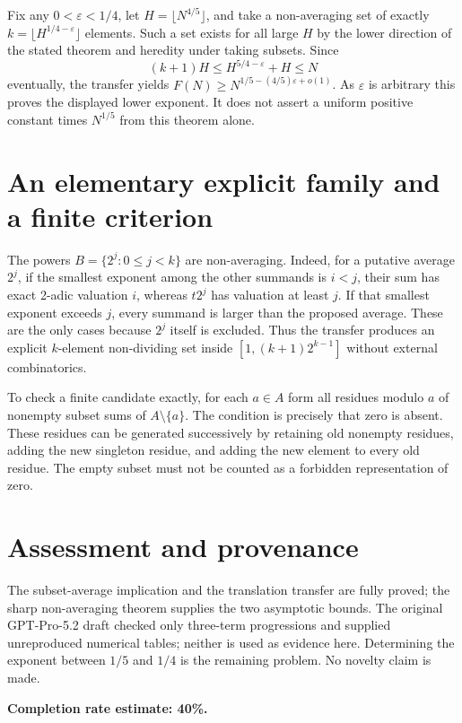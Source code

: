 \documentclass[11pt]{article}
\begin{document}
Fix any $0<\varepsilon<1/4$, let $H=\lfloor N^{4/5}\rfloor$, and take a non-averaging set of exactly $k=\lfloor H^{1/4-\varepsilon}\rfloor$ elements. Such a set exists for all large $H$ by the lower direction of the stated theorem and heredity under taking subsets. Since
\[
 (k+1)H\le H^{5/4-\varepsilon}+H\le N
\]
eventually, the transfer yields
$F(N)\ge N^{1/5-(4/5)\varepsilon+o(1)}$.
As $\varepsilon$ is arbitrary this proves the displayed lower exponent. It does not assert a uniform positive constant times $N^{1/5}$ from this theorem alone.

\section*{An elementary explicit family and a finite criterion}
The powers $B=\{2^j:0\le j<k\}$ are non-averaging. Indeed, for a putative average $2^j$, if the smallest exponent among the other summands is $i<j$, their sum has exact 2-adic valuation $i$, whereas $t2^j$ has valuation at least $j$. If that smallest exponent exceeds $j$, every summand is larger than the proposed average. These are the only cases because $2^j$ itself is excluded.
Thus the transfer produces an explicit $k$-element non-dividing set inside $[1,(k+1)2^{k-1}]$ without external combinatorics.

To check a finite candidate exactly, for each $a\in A$ form all residues modulo $a$ of nonempty subset sums of $A\setminus\{a\}$. The condition is precisely that zero is absent. These residues can be generated successively by retaining old nonempty residues, adding the new singleton residue, and adding the new element to every old residue. The empty subset must not be counted as a forbidden representation of zero.

\section*{Assessment and provenance}
The subset-average implication and the translation transfer are fully proved; the sharp non-averaging theorem supplies the two asymptotic bounds. The original GPT-Pro-5.2 draft checked only three-term progressions and supplied unreproduced numerical tables; neither is used as evidence here. Determining the exponent between $1/5$ and $1/4$ is the remaining problem. No novelty claim is made.

\textbf{Completion rate estimate: 40\%.}
\end{document}
